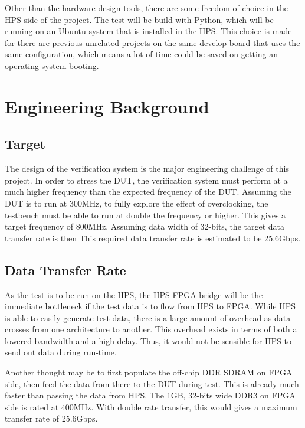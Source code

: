 \documentclass[journal]{IEEEtran}
\begin{document}
Other than the hardware design tools, there are some freedom of choice in the
HPS side of the project.
The test will be build with Python, which will be running on an Ubuntu system
that is installed in the HPS.
This choice is made for there are previous unrelated projects on the same
develop board that uses the same configuration, which means a lot of time
could be saved on getting an operating system booting.

\section{Engineering Background}

\subsection{Target}
The design of the verification system is the major engineering challenge of this
project.
In order to stress the DUT, the verification system must perform at a much
higher frequency than the expected frequency of the DUT.
Assuming the DUT is to run at 300MHz, to fully explore the effect of
overclocking, the testbench must be able to run at double the frequency or
higher.
This gives a target frequency of 800MHz.
Assuming data width of 32-bits, the target data transfer rate is then 
This required data transfer rate is estimated to be 25.6Gbps.

\subsection{Data Transfer Rate}
As the test is to be run on the HPS, the HPS-FPGA bridge will be the
immediate bottleneck if the test data is to flow from HPS to FPGA.
While HPS is able to easily generate test data,
there is a large amount of overhead as data crosses from one architecture
to another.
This overhead exists in terms of both a lowered bandwidth and a high delay.
Thus, it would not be sensible for HPS to send out data during run-time.

Another thought may be to first populate the off-chip DDR SDRAM on FPGA
side, then feed the data from there to the DUT during test.
This is already much faster than passing the data from HPS.
The 1GB, 32-bits wide DDR3 on FPGA side is rated at 400MHz.
With double rate transfer, this would gives a maximum transfer rate of 25.6Gbps.
\end{document}
